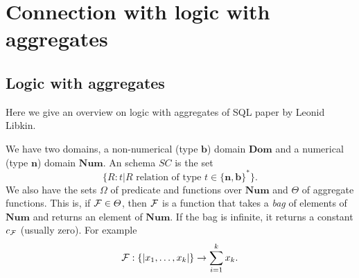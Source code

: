 \section{Connection with logic with aggregates}
\newcommand{\ML}{\mathsf{MATLANG}}
\newcommand{\reals}{\mathbf{R}}
\newcommand{\cmplx}{\mathbf{C}}
\newcommand{\nat}{\mathbf{N}}
\newcommand{\pnat}{\nat_{>0}}
\newcommand{\var}{var}
\newcommand{\scm}{\mathcal{S}}
\newcommand{\sizevar}{\mathsf{SizeVars}}
\newcommand{\mname}{\mathsf{MatNames}}
\newcommand{\allinst}[1]{\mathcal{I}_{#1}}
\newcommand{\cmats}{\mathcal{M}}
\newcommand{\false}{\bot}
\newcommand{\true}{\top}
\newcommand{\boolinterp}{\nu}
\newcommand{\Rel}{\mathit{Rel}}
\newcommand{\Mat}{\mathit{Mat}}
\newcommand{\one}{\mathbf{1}}
\newcommand{\Sum}{\mathsf{sum}}
\newcommand{\diag}{\mathsf{diag}}
\newcommand{\Apply}{\mathsf{apply}}
\newcommand{\Tb}{\mathbf{b}}
\newcommand{\Tn}{\mathbf{n}}
\newcommand{\dom}{\mathbf{dom}}
\newcommand{\rname}{\mathsf{RelNames}}
\newcommand{\bDom}{\textbf{Dom}}
\newcommand{\bNum}{\textbf{Num}}
\newtheorem{proposition}{Proposition}

\subsection{Logic with aggregates}

Here we give an overview on logic with aggregates of SQL paper by Leonid Libkin.

We have two domains, a non-numerical (type $\textbf{b}$) domain $\bDom$ and a numerical (type $\textbf{n}$) domain $\bNum$. An schema $SC$ is the set $$\lbrace R:t | R \text{ relation of type } t\in\lbrace\textbf{n},\textbf{b}\rbrace^*\rbrace.$$ We also have the sets $\Omega$ of predicate and functions over $\bNum$ and $\varTheta$ of aggregate functions. This is, if $\mathcal{F}\in\varTheta$, then $\mathcal{F}$ is a function that takes a \textit{bag} of elements of $\bNum$ and returns an element of $\bNum$. If the bag is infinite, it returns a constant $c_{\mathcal{F}}$ (usually zero). For example $$\mathcal{F}:\lbrace\vert x_1,\ldots,x_k\vert\rbrace\rightarrow\sum_{i=1}^k x_k.$$

